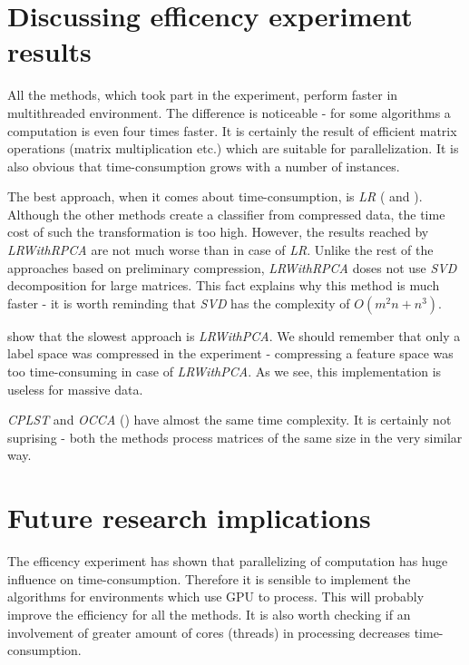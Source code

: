 \section{Discussing efficency experiment results}

All the methods, which took part in the experiment, perform faster in multithreaded environment. The difference is noticeable - for some algorithms a computation is even four times faster. It is certainly the result of efficient matrix operations (matrix multiplication etc.) which are suitable for parallelization. It is also obvious that time-consumption grows with a number of instances.

The best approach, when it comes about time-consumption, is \textit{LR} ( and ). Although the other methods create a classifier from compressed data, the time cost of such the transformation is too high. However, the results reached by \textit{LRWithRPCA} are not much worse than in case of \textit{LR}. Unlike the rest of the approaches based on preliminary compression, \textit{LRWithRPCA} doses not use \textit{SVD} decomposition for large matrices. This fact explains why this method is much faster - it is worth reminding that \textit{SVD} has the complexity of $O(m^2n+n^3)$. 

 show that the slowest approach is \textit{LRWithPCA}. We should remember that only a label space was compressed in the experiment - compressing a feature space was too time-consuming in case of \textit{LRWithPCA}. As we see, this implementation is useless for massive data. 

\textit{CPLST} and \textit{OCCA} () have almost the same time complexity. It is certainly not suprising - both the methods process matrices of the same size in the very similar way.

\section{Future research implications}

The efficency experiment has shown that parallelizing of computation has huge influence on time-consumption. Therefore it is sensible to implement the algorithms for environments which use GPU to process. This will probably improve the efficiency for all the methods. It is also worth checking if an involvement of greater amount of cores (threads) in processing decreases time-consumption.  

